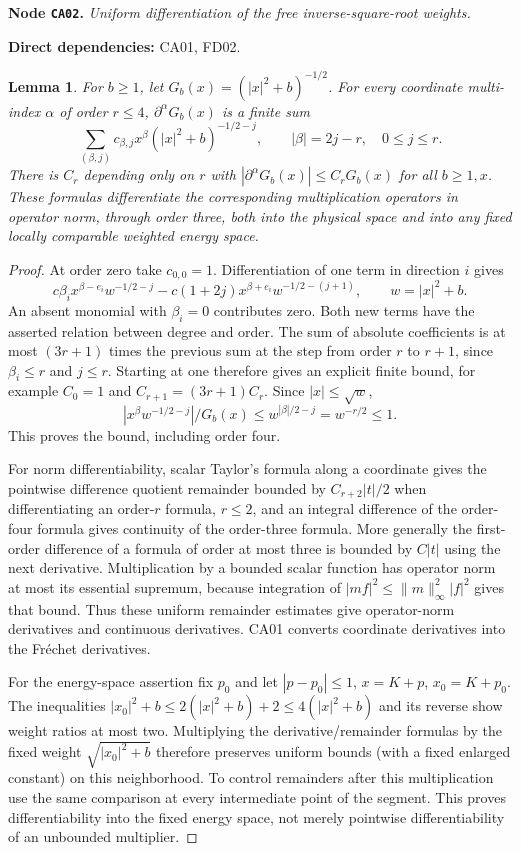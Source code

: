 \documentclass[11pt,a4paper]{article}
\newtheorem{lemma}[theorem]{Lemma}
\theoremstyle{remark}\newtheorem{remark}[theorem]{Remark}
\newcommand{\node}[3]{\par\Needspace{6\baselineskip}\smallskip\hypertarget{node:#1}{}\label{nodepage:#1}\noindent\textbf{Node \texttt{#1}.} \textit{#2.}\par\noindent\textbf{Direct dependencies:} #3.\par}
\begin{document}
\node{CA02}{Uniform differentiation of the free inverse-square-root weights}{CA01, FD02}
\begin{lemma}\label{lem:weightderivatives}
For $b\geq1$, let $G_b(x)=(|x|^2+b)^{-1/2}$. For every coordinate multi-index $\alpha$ of order $r\leq4$, $\partial^\alpha G_b(x)$ is a finite sum
\[
 \sum_{(\beta,j)}c_{\beta,j}x^\beta(|x|^2+b)^{-1/2-j},
 \qquad |\beta|=2j-r,\quad 0\leq j\leq r.
\]
There is $C_r$ depending only on $r$ with
$|\partial^\alpha G_b(x)|\leq C_rG_b(x)$ for all $b\geq1,x$. These formulas differentiate the corresponding multiplication operators in operator norm, through order three, both into the physical space and into any fixed locally comparable weighted energy space.
\end{lemma}
\begin{proof}
At order zero take $c_{0,0}=1$. Differentiation of one term in direction $i$ gives
\[
 c\beta_i x^{\beta-e_i}w^{-1/2-j}
   -c(1+2j)x^{\beta+e_i}w^{-1/2-(j+1)},\qquad w=|x|^2+b.
\]
An absent monomial with $\beta_i=0$ contributes zero. Both new terms have the asserted relation between degree and order. The sum of absolute coefficients is at most $(3r+1)$ times the previous sum at the step from order $r$ to $r+1$, since $\beta_i\leq r$ and $j\leq r$. Starting at one therefore gives an explicit finite bound, for example $C_0=1$ and $C_{r+1}=(3r+1)C_r$. Since $|x|\leq\sqrt w$,
\[
 |x^\beta w^{-1/2-j}|/G_b(x)
 \leq w^{|\beta|/2-j}=w^{-r/2}\leq1.
\]
This proves the bound, including order four.

For norm differentiability, scalar Taylor's formula along a coordinate gives the pointwise difference quotient remainder bounded by $C_{r+2}|t|/2$ when differentiating an order-$r$ formula, $r\leq2$, and an integral difference of the order-four formula gives continuity of the order-three formula. More generally the first-order difference of a formula of order at most three is bounded by $C|t|$ using the next derivative. Multiplication by a bounded scalar function has operator norm at most its essential supremum, because integration of $|mf|^2\leq\|m\|_\infty^2|f|^2$ gives that bound. Thus these uniform remainder estimates give operator-norm derivatives and continuous derivatives. CA01 converts coordinate derivatives into the Fr\'echet derivatives.

For the energy-space assertion fix $p_0$ and let $|p-p_0|\leq1$, $x=K+p$, $x_0=K+p_0$. The inequalities
$|x_0|^2+b\leq2(|x|^2+b)+2\leq4(|x|^2+b)$ and its reverse show weight ratios at most two. Multiplying the derivative/remainder formulas by the fixed weight $\sqrt{|x_0|^2+b}$ therefore preserves uniform bounds (with a fixed enlarged constant) on this neighborhood. To control remainders after this multiplication use the same comparison at every intermediate point of the segment. This proves differentiability into the fixed energy space, not merely pointwise differentiability of an unbounded multiplier.
\end{proof}
\end{document}
